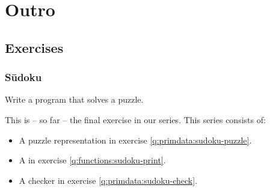 \chapter{Outro}

\section{Exercises}

\subsection{Sūdoku}

Write a program that solves a puzzle.

This is -- so far -- the final exercise in our  series. This series consists of:
\begin{itemize}
  \item A puzzle representation in exercise \ref{q:primdata:sudoku-puzzle}.
  \item A  in exercise \ref{q:functions:sudoku-print}.
  \item A checker in exercise \ref{q:primdata:sudoku-check}.
\end{itemize}

